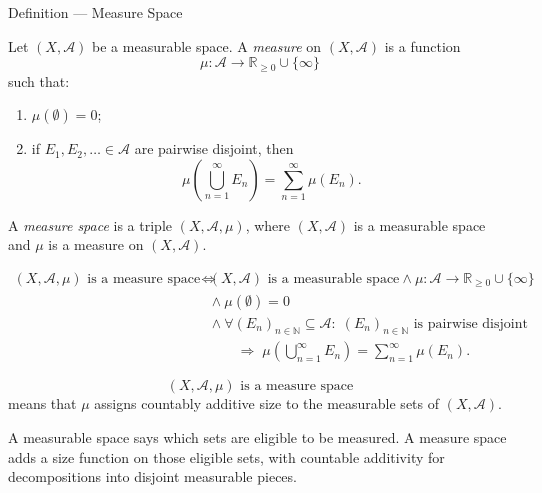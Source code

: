 \begin{definitionbox}{Definition --- Measure Space}
\begin{definition}\label{def:measure-space}
Let \((X,\mathcal{A})\) be a measurable space.  A \emph{measure} on
\((X,\mathcal{A})\) is a function
\[
  \mu:\mathcal{A}\to\mathbb{R}_{\geq 0}\cup\{\infty\}
\]
such that:
\begin{enumerate}
  \item \(\mu(\emptyset)=0\);
  \item if \(E_1,E_2,\ldots\in\mathcal{A}\) are pairwise disjoint, then
        \[
          \mu\!\left(\bigcup_{n=1}^{\infty}E_n\right)
          =
          \sum_{n=1}^{\infty}\mu(E_n).
        \]
\end{enumerate}
A \emph{measure space} is a triple \((X,\mathcal{A},\mu)\), where
\((X,\mathcal{A})\) is a measurable space and \(\mu\) is a measure on
\((X,\mathcal{A})\).
\end{definition}
\end{definitionbox}

\begin{remark*}
\[
\begin{aligned}
\text{\((X,\mathcal{A},\mu)\) is a measure space}
\Longleftrightarrow\;&
\text{\((X,\mathcal{A})\) is a measurable space}
\land
\mu:\mathcal{A}\to\mathbb{R}_{\geq 0}\cup\{\infty\}
\\
&{}\land \mu(\emptyset)=0
\\
&{}\land
\forall (E_n)_{n\in\mathbb{N}}\subseteq\mathcal{A}{:}\;
\text{\((E_n)_{n\in\mathbb{N}}\) is pairwise disjoint}
\\
&{}\qquad\Longrightarrow\;
\mu\!\left(\bigcup_{n=1}^{\infty}E_n\right)
=
\sum_{n=1}^{\infty}\mu(E_n).
\end{aligned}
\]
\end{remark*}

\begin{remark*}
\[
\text{\((X,\mathcal{A},\mu)\) is a measure space}
\]
means that \(\mu\) assigns countably additive size to the measurable sets of
\((X,\mathcal{A})\).
\end{remark*}

\begin{remark*}[Interpretation]
A measurable space says which sets are eligible to be measured.  A measure
space adds a size function on those eligible sets, with countable additivity
for decompositions into disjoint measurable pieces.
\end{remark*}

\DefinitionalRoot
